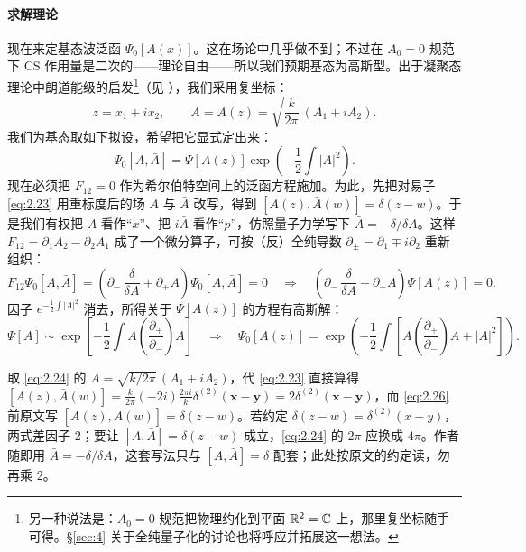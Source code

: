 \paragraph{求解理论}现在来定基态波泛函 $\Psi_0[A(x)]$。这在场论中几乎做不到；不过在 $A_0 = 0$ 规范下 CS 作用量是二次的——理论自由——所以我们预期基态为高斯型。出于凝聚态理论中朗道能级的启发\footnote{另一种说法是：$A_0 = 0$ 规范把物理约化到平面 $\mathbb{R}^2 = \mathbb{C}$ 上，那里复坐标随手可得。\S\ref{sec:4} 关于全纯量子化的讨论也将呼应并拓展这一想法。}（见 \cite{dunne}），我们采用复坐标：
\begin{equation}\tag{2.24}\label{eq:2.24}
  z = x_1 + i x_2, \qquad A = A(z) = \sqrt{\frac{k}{2\pi}}\,(A_1 + iA_2).
\end{equation}
我们为基态取如下拟设，希望把它显式定出来：
\begin{equation}\tag{2.25}\label{eq:2.25}
  \Psi_0[A,\bar A] = \Psi[A(z)]\exp\left(-\frac12\int |A|^2\right).
\end{equation}
现在必须把 $F_{12} = 0$ 作为希尔伯特空间上的泛函方程施加。为此，先把对易子 \eqref{eq:2.23} 用重标度后的场 $A$ 与 $\bar A$ 改写，得到 $[A(z),\bar A(w)] = \delta(z-w)$。于是我们有权把 $A$ 看作“$x$”、把 $i\bar A$ 看作“$p$”，仿照量子力学写下 $\bar A = -\delta/\delta A$。这样 $F_{12} = \partial_1A_2 - \partial_2A_1$ 成了一个微分算子，可按（反）全纯导数 $\partial_\pm = \partial_1\mp i\partial_2$ 重新组织：
\begin{equation}\tag{2.26}\label{eq:2.26}
  F_{12}\Psi_0[A,\bar A]
  = \left(\partial_-\,\frac{\delta}{\delta A} + \partial_+A\right)\Psi_0[A,\bar A] = 0
  \quad\Longrightarrow\quad
  \left(\partial_-\,\frac{\delta}{\delta A} + \partial_+A\right)\Psi[A(z)] = 0.
\end{equation}
因子 $e^{-\frac12\int|A|^2}$ 消去，所得关于 $\Psi[A(z)]$ 的方程有高斯解：
\begin{equation}\tag{2.27}\label{eq:2.27}
  \Psi[A] \sim \exp\left[-\frac12\int A\left(\frac{\partial_+}{\partial_-}\right)A\right]
  \quad\Longrightarrow\quad
  \Psi_0[A(z)] = \exp\left(-\frac12\int\left[A\left(\frac{\partial_+}{\partial_-}\right)A + |A|^2\right]\right).
\end{equation}

\begin{yizhu}[易错点]
取 \eqref{eq:2.24} 的 $A=\sqrt{k/2\pi}\,(A_1+iA_2)$，代 \eqref{eq:2.23} 直接算得 $[A(z),\bar A(w)] = \frac{k}{2\pi}(-2i)\frac{2\pi i}{k}\delta^{(2)}(\mathbf x-\mathbf y) = 2\delta^{(2)}(\mathbf x-\mathbf y)$，而 \eqref{eq:2.26} 前原文写 $[A(z),\bar A(w)] = \delta(z-w)$。若约定 $\delta(z-w)=\delta^{(2)}(x-y)$，两式差因子 2；要让 $[A,\bar A]=\delta(z-w)$ 成立，\eqref{eq:2.24} 的 $2\pi$ 应换成 $4\pi$。作者随即用 $\bar A=-\delta/\delta A$，这套写法只与 $[A,\bar A]=\delta$ 配套；此处按原文的约定读，勿再乘 2。
\end{yizhu}

